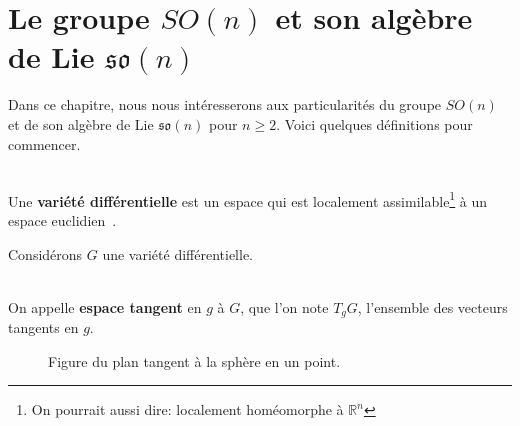 \documentclass[12pt]{report}
\begin{document}
\chapter{\texorpdfstring{Le groupe $SO(n)$ et son algèbre de Lie $\mathfrak{so}(n)$}{Le groupe SO (n) et son algèbre de Lie so (n)}}

Dans ce chapitre, nous nous intéresserons aux particularités du groupe $SO(n)$ et de son algèbre de Lie $\mathfrak{so}(n)$ pour $n\geqslant 2$. Voici quelques définitions pour commencer.

\begin{definition} \leavevmode\\
Une \textbf{variété différentielle} est un espace qui est localement assimilable\footnote{On pourrait aussi dire: localement homéomorphe à $\mathbb{R}^n$} à un espace euclidien~\cite{Hol24}.
\end{definition}

Considérons $G$ une variété différentielle.

\begin{definition} \label{def:espace-tangent}\leavevmode\\
On appelle \textbf{espace tangent} en $g$ à $G$, que l'on note $T_{g}G$, l'ensemble des vecteurs tangents en $g$.
\end{definition}

\begin{figure}[H]
  \centering
  \caption{Figure du plan tangent à la sphère en un point.}
\end{figure}
\end{document}
